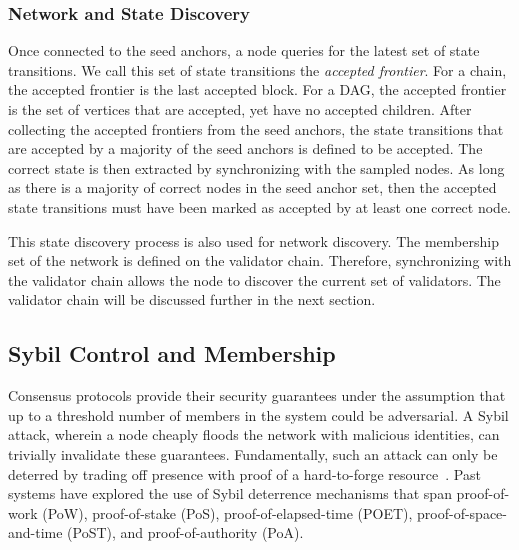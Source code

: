 \documentclass[runningheads]{llncs}
\begin{document}
\subsubsection{Network and State Discovery}
Once connected to the seed anchors, a node queries for the latest set of state transitions. We call this set of state transitions the \emph{accepted frontier}. For a chain, the accepted frontier is the last accepted block. For a DAG, the accepted frontier is the set of vertices that are accepted, yet have no accepted children. After collecting the accepted frontiers from the seed anchors, the state transitions that are accepted by a majority of the seed anchors is defined to be accepted. The correct state is then extracted by synchronizing with the sampled nodes.
As long as there is a majority of correct nodes in the seed anchor set, then the accepted state transitions must have been marked as accepted by at least one correct node.


This state discovery process is also used for network discovery. The membership set of the network is defined on the validator chain. Therefore, synchronizing with the validator chain allows the node to discover the current set of validators. The validator chain will be discussed further in the next section.

\subsection{Sybil Control and Membership}
Consensus protocols provide their security guarantees under the assumption that up to a threshold number of members in the system could be adversarial.
A Sybil attack, wherein a node cheaply floods the network with malicious identities, can trivially invalidate these guarantees. 
Fundamentally, such an attack can only be deterred by trading off presence with proof of a hard-to-forge resource~\cite{douceur2002sybil}. 
Past systems have explored the use of Sybil deterrence mechanisms that span proof-of-work (PoW), proof-of-stake (PoS), proof-of-elapsed-time (POET), proof-of-space-and-time (PoST), and proof-of-authority (PoA).
\end{document}
